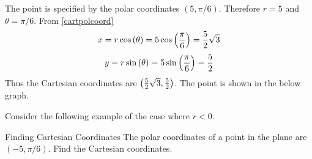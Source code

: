 \begin{solution}
The point is specified by the polar coordinates $\left( 5,\pi /6\right)$. Therefore $r=5$ and $\theta = \pi /6$. 
From \ref{cartpolcoord}
\[
x= r \cos \left( \theta \right)= 5\cos \left( \vspace{0.05in}\frac{\pi }{6}\right) = \vspace{0.05in}\frac{5}{2}\sqrt{3}
\]
\[
y= r \sin \left( \theta \right) = 5\sin \left( \vspace{0.05in}\frac{\pi }{6}\right) = \vspace{0.05in}\frac{5}{2}
\]
Thus the Cartesian coordinates are $\left( \vspace{0.05in}\frac{5}{2}\sqrt{3}, \vspace{0.05in}\frac{5}{2}\right)$. The point is shown in the below graph. 

\begin{center}
\end{center}
\end{solution}

Consider the following example of the case where $r < 0$. 

\begin{example}{Finding Cartesian Coordinates}
The polar coordinates of a point in the plane are $\left( -5,\pi /6\right) .$
Find the Cartesian coordinates.
\end{example}

